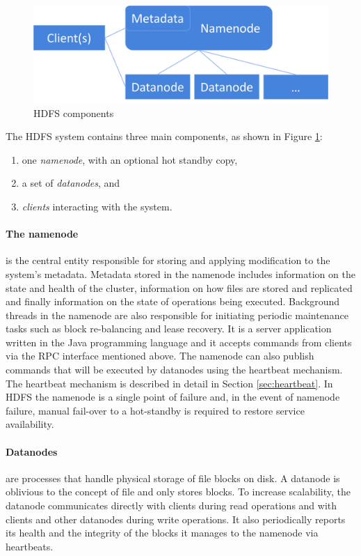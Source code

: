 \begin{figure}[ht]
\caption{HDFS components}
\label{fig:hdfs-block-diagram}
\centering
\includegraphics[width=1.0\textwidth]{images/hdfs-block-diagram.png}
\end{figure}

The HDFS system contains three main components, as shown in Figure \ref{fig:hdfs-block-diagram}:
\begin{enumerate}
\item one \emph{namenode}, with an optional hot standby copy,
\item a set of \emph{datanodes}, and
\item \emph{clients} interacting with the system.
\end{enumerate}

\paragraph{The namenode} is the central entity responsible for storing and applying modification to the system's metadata.
Metadata stored in the namenode includes information on the state and health of the cluster, information on how files are stored and replicated and finally information on the state of operations being executed.
Background threads in the namenode are also responsible for initiating periodic maintenance tasks such as block re-balancing and lease recovery.
It is a server application written in the Java programming language and it accepts commands from clients via the RPC interface mentioned above.
The namenode can also publish commands that will be executed by datanodes using the heartbeat mechanism.
The heartbeat mechanism is described in detail in Section \ref{sec:heartbeat}.
In HDFS the namenode is a single point of failure and, in the event of namenode failure, manual fail-over to a hot-standby is required to restore service availability.

\paragraph{Datanodes} are processes that handle physical storage of file blocks on disk.
A datanode is oblivious to the concept of file and only stores blocks.
To increase scalability, the datanode communicates directly with clients during read operations and with clients and other datanodes during write operations.
It also periodically reports its health and the integrity of the blocks it manages to the namenode via heartbeats.

